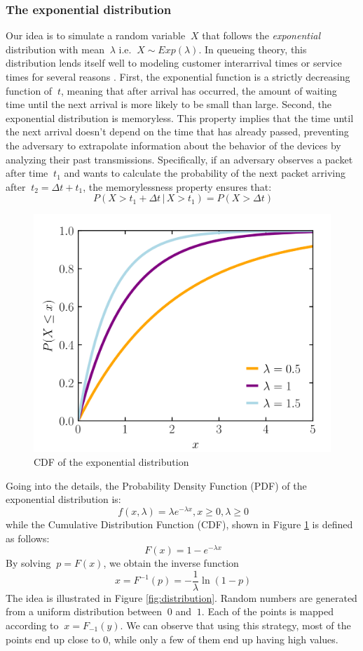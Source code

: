 \subsubsection{The exponential distribution}
Our idea is to simulate a random variable \(\ X \) that follows the \textit{exponential} distribution with mean \(\ \lambda \) i.e. \(\ X \sim Exp(\lambda) \). In queueing theory, this distribution lends itself well to modeling customer interarrival times or service times for several reasons \cite{QUEUING_THEORY}. First, the exponential function is a strictly decreasing function of \(\ t \), meaning that after arrival has occurred, the amount of waiting time until the next arrival is more likely to be small than large. Second, the exponential distribution is memoryless. This property implies that the time until the next arrival doesn't depend on the time that has already passed, preventing the adversary to extrapolate information about the behavior of the devices by analyzing their past transmissions. Specifically, if an adversary observes a packet after time \(\ t_1 \) and wants to calculate the probability of the next packet arriving after \(\ t_2 = \Delta t + t_1 \), the memorylessness property ensures that:
\[\ P(X>t_1+\Delta t \,|\, X>t_1) = P(X>\Delta t) \]

\vspace{3mm}
\begin{figure}[H]
    \centering
     \includegraphics[width=0.7\linewidth]{images/countermeasures/cumulative_distribution_function.png}
    \caption{CDF of the exponential distribution}
    \label{fig:cdf}
\end{figure}
\vspace{3mm}

Going into the details, the Probability Density Function (PDF) of the exponential distribution is:
\[\ f(x, \lambda ) = \lambda e^{-\lambda x}, x \geq 0, \lambda \geq 0 \]
while the Cumulative Distribution Function (CDF), shown in Figure \ref{fig:cdf} is defined as follows:
\[\ F(x) = 1 - e^{-\lambda x} \]
By solving \(\ p = F(x) \), we obtain the inverse function
\[\ x = F^{-1}(p) = -\frac{1}{\lambda}\ln(1-p) \]
The idea is illustrated in Figure \ref{fig:distribution}. Random numbers are generated from a uniform distribution between \(\ 0 \) and \(\ 1 \). Each of the points is mapped according to \(\ x = F_{-1}(y) \). We can observe that using this strategy, most of the points end up close to 0, while only a few of them end up having high values.

